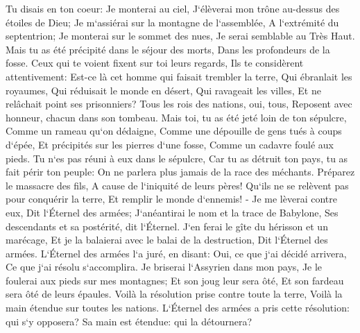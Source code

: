 \verse Tu disais en ton coeur: Je monterai au ciel, J`élèverai mon trône au-dessus des étoiles de Dieu; Je m`assiérai sur la montagne de l`assemblée, A l`extrémité du septentrion; 
\verse Je monterai sur le sommet des nues, Je serai semblable au Très Haut. 
\verse Mais tu as été précipité dans le séjour des morts, Dans les profondeurs de la fosse. 
\verse Ceux qui te voient fixent sur toi leurs regards, Ils te considèrent attentivement: Est-ce là cet homme qui faisait trembler la terre, Qui ébranlait les royaumes, 
\verse Qui réduisait le monde en désert, Qui ravageait les villes, Et ne relâchait point ses prisonniers? 
\verse Tous les rois des nations, oui, tous, Reposent avec honneur, chacun dans son tombeau. 
\verse Mais toi, tu as été jeté loin de ton sépulcre, Comme un rameau qu`on dédaigne, Comme une dépouille de gens tués à coups d`épée, Et précipités sur les pierres d`une fosse, Comme un cadavre foulé aux pieds. 
\verse Tu n`es pas réuni à eux dans le sépulcre, Car tu as détruit ton pays, tu as fait périr ton peuple: On ne parlera plus jamais de la race des méchants. 
\verse Préparez le massacre des fils, A cause de l`iniquité de leurs pères! Qu`ils ne se relèvent pas pour conquérir la terre, Et remplir le monde d`ennemis! - 
\verse Je me lèverai contre eux, Dit l`Éternel des armées; J`anéantirai le nom et la trace de Babylone, Ses descendants et sa postérité, dit l`Éternel. 
\verse J`en ferai le gîte du hérisson et un marécage, Et je la balaierai avec le balai de la destruction, Dit l`Éternel des armées. 
\verse L`Éternel des armées l`a juré, en disant: Oui, ce que j`ai décidé arrivera, Ce que j`ai résolu s`accomplira. 
\verse Je briserai l`Assyrien dans mon pays, Je le foulerai aux pieds sur mes montagnes; Et son joug leur sera ôté, Et son fardeau sera ôté de leurs épaules. 
\verse Voilà la résolution prise contre toute la terre, Voilà la main étendue sur toutes les nations. 
\verse L`Éternel des armées a pris cette résolution: qui s`y opposera? Sa main est étendue: qui la détournera? 
